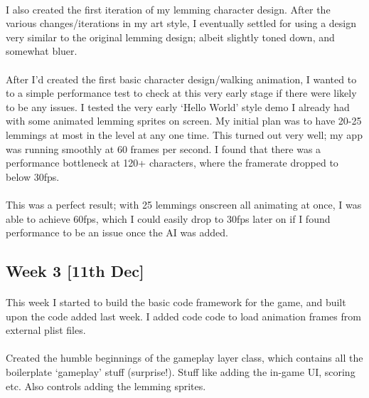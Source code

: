 \documentclass[a4paper,oneside]{report}
\begin{document}
\paragraph{} I also created the first iteration of my lemming character design. After the various changes/iterations in my art style, I eventually settled for using a design very similar to the original lemming design; albeit slightly toned down, and somewhat bluer.

\paragraph{} After I’d created the first basic character design/walking animation, I wanted to to a simple performance test to check at this very early stage if there were likely to be any issues. I tested the very early ‘Hello World’ style demo I already had with some animated lemming sprites on screen. My initial plan was to have 20-25 lemmings at most in the level at any one time. This turned out very well; my app was running smoothly at 60 frames per second. I found that there was a performance bottleneck at 120+ characters, where the framerate dropped to below 30fps.

\paragraph{} This was a perfect result; with 25 lemmings onscreen all animating at once, I was able to achieve 60fps, which I could easily drop to 30fps later on if I found performance to be an issue once the AI was added.



\subsection{Week 3 [11th Dec]}

\paragraph{} This week I started to build the basic code framework for the game, and built upon the code added last week. I added code code to load animation frames from external plist files.

\paragraph{} Created the humble beginnings of the gameplay layer class, which contains all the boilerplate ‘gameplay’ stuff (surprise!). Stuff like adding the in-game UI, scoring etc. Also controls adding the lemming sprites.
\end{document}
